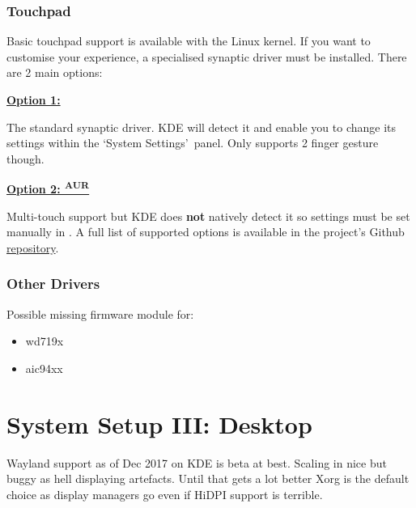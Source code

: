 \subsubsection{Touchpad}

Basic touchpad support is available with the Linux kernel. If you want to customise your experience, a specialised synaptic driver must be installed. There are 2 main options:

\vspace*{1em}
\textbf{\textcolor{textgrey}{\underline{Option 1: }}}

The standard synaptic driver. KDE will detect it and enable you to change its settings within the \lq System Settings\rq\ panel. Only supports 2 finger gesture though.


\vspace*{1em}
\textbf{\textcolor{textgrey}{\underline{Option 2: \textsuperscript{AUR}}}}

Multi-touch support but KDE does \textbf{not} natively detect it so settings must be set manually in . A full list of supported options is available in the project's Github \href{https://github.com/p2rkw/xf86-input-mtrack}{repository}.


\subsubsection{Other Drivers}

Possible missing firmware module for:
\begin{itemize}[noitemsep,topsep=0pt,leftmargin=*]
	\item wd719x
	\item aic94xx
\end{itemize}


\section{System Setup III: Desktop}

Wayland support as of Dec 2017 on KDE is beta at best. Scaling in nice but buggy as hell displaying artefacts. Until that gets a lot better Xorg is the default choice as display managers go even if HiDPI support is terrible. 

